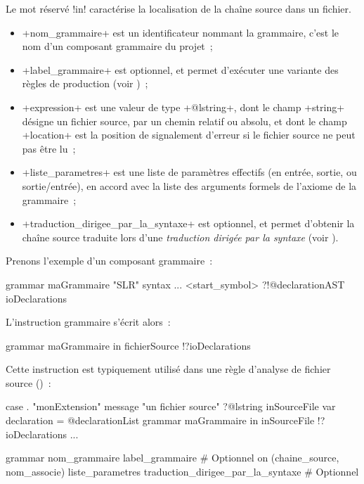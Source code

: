 Le mot réservé \ggs!in! caractérise la localisation de la chaîne source dans un fichier.
\begin{itemize}
  \item \ggs+nom_grammaire+ est un identificateur nommant la grammaire, c'est le nom d'un composant grammaire du projet~;
  \item \ggs+label_grammaire+ est optionnel, et permet d'exécuter une variante des règles de production (voir )~;
  \item \ggs+expression+ est une valeur de type \ggs+@lstring+, dont le champ \ggs+string+ désigne un fichier source, par un chemin relatif ou absolu, et dont le champ \ggs+location+ est la position de signalement d'erreur si le fichier source ne peut pas être lu~;
  \item \ggs+liste_parametres+ est une liste de paramètres effectifs (en entrée, sortie, ou sortie/entrée), en accord avec la liste des arguments formels de l'axiome de la grammaire~;
  \item \ggs+traduction_dirigee_par_la_syntaxe+ est optionnel, et permet d'obtenir la chaîne source traduite lors d'une \emph{traduction dirigée par la syntaxe} (voir ).
\end{itemize}

Prenons l'exemple d'un composant grammaire~:
\begin{galgas}
grammar maGrammaire "SLR" {
  syntax ...
   <start_symbol> ?!@declarationAST ioDeclarations
}
\end{galgas}

L'instruction grammaire s'écrit alors~:
\begin{galgas}
grammar maGrammaire in fichierSource !?ioDeclarations
\end{galgas}

Cette instruction est typiquement utilisé dans une règle d'analyse de fichier source ()~:

\begin{galgas}
case . "monExtension"
message "un fichier source"
?@lstring inSourceFile {
  var declaration = @declarationList {}
  grammar maGrammaire in inSourceFile !?ioDeclarations
  ...
}
\end{galgas}




\begin{galgasbox}
grammar
  nom_grammaire
  label_grammaire # Optionnel
  on (chaine_source, nom_associe)
  liste_parametres
  traduction_dirigee_par_la_syntaxe # Optionnel
\end{galgasbox}

